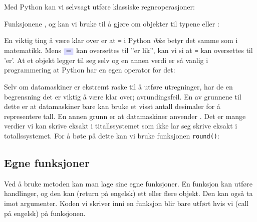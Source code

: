 Med Python kan vi selvsagt utføre klassiske regneoperasjoner: \vspace{4pt}

 \vsk
\newpage
Funksjonene ,  og  kan vi bruke til å gjøre om objekter til typene  eller : 
 \vsk

En viktig ting å være klar over er at \texttt{=} i Python \textsl{ikke} betyr det samme som \sym{$ = $} i matematikk. Mens $ \sym{=} $ kan oversettes til ''er lik'', kan vi si at \texttt{=} kan oversettes til 'er'.
 \newpage
At et objekt legger til seg selv og en annen verdi er så vanlig i programmering at Python har en egen operator for det:
\vsk

Selv om datamaskiner er ekstremt raske til å utføre utregninger, har de en begrensning det er viktig å være klar over; avrundingsfeil. En av grunnene til dette er at datamaskiner bare kan bruke et visst antall desimaler for å representere tall. En annen grunn er at datamaskiner anvender . Det er mange verdier vi kan skrive eksakt i titallssystemet som ikke lar seg skrive eksakt i totallssystemet. For å bøte på dette kan vi bruke funksjonen \texttt{round()}\label{round()}:\regv

\newpage
\subsection{Egne funksjoner}
Ved å bruke metoden  kan man lage sine egne funksjoner. En funksjon kan utføre handlinger, og den kan  (return på engelsk) ett eller flere objekt. Den kan også ta imot argumenter. Koden vi skriver inni en funksjon blir bare utført hvis vi  (call på engelsk) på funksjonen. \regv


